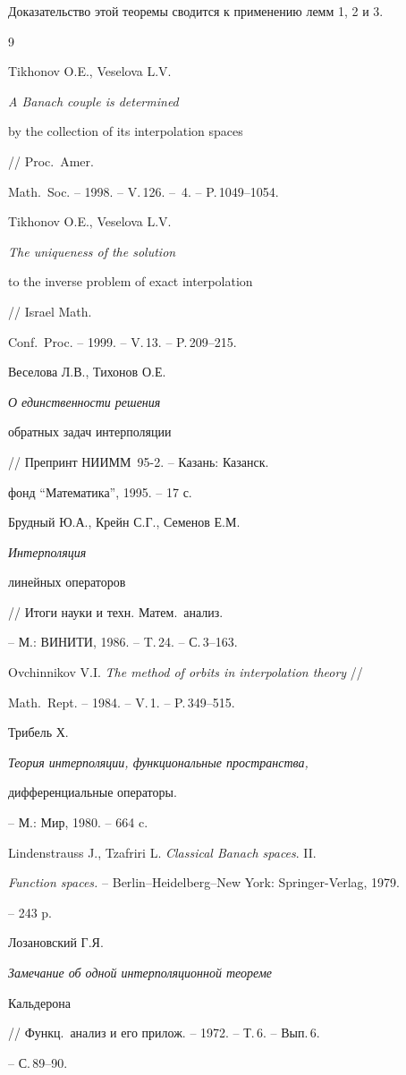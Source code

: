 Доказательство этой теоремы сводится к применению лемм 1, 2 и 3.





\begin{thebibliography}{9}







Tikhonov O.E., Veselova L.V. {\it A Banach couple is determined 


by the collection of its interpolation spaces} // Proc.\ Amer.\ 


Math.\ Soc. -- 1998. -- V.\,126. -- \No\,4. -- P.\,1049--1054. 




Tikhonov O.E., Veselova L.V. {\it The uniqueness of the solution 


to the inverse problem of exact interpolation} // Israel Math.\ 


Conf.\ Proc. -- 1999. -- V.\,13. -- P.\,209--215.




Веселова Л.В., Тихонов О.Е. {\it О единственности решения


обратных задач интерполяции} // Препринт НИИММ \No\,95-2. -- Казань: Казанск.


фонд ``Математика'', 1995. -- 17 с.








Брудный Ю.А., Крейн С.Г., Семенов Е.М. {\it Интерполяция 


линейных операторов} // Итоги науки и техн. Матем.\ анализ.


-- М.: ВИНИТИ, 1986. -- T.\,24. -- С.\,3--163. 




Ovchinnikov V.I. {\it The method of orbits in interpolation theory} // 


Math.\ Rept. -- 1984. -- V.\,1. -- P.\,349--515.  




Трибель Х. {\it Теория интерполяции, функциональные пространства,


дифференциальные операторы.} -- М.: Мир, 1980. -- 664 c.




Lindenstrauss J., Tzafriri L. {\it Classical Banach spaces}. II. 


{\it Function spaces.} -- Berlin--Heidelberg--New York: Springer-Verlag, 1979.


-- 243 p.




Лозановский Г.Я. {\it Замечание об одной интерполяционной теореме 


Кальдерона} // Функц.\ анализ и его прилож. -- 1972. -- Т.\,6. -- Вып.\,6. 


-- С.\,89--90.





\end{thebibliography}
